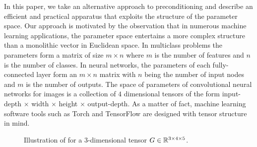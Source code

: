 In this paper, we take an alternative approach to preconditioning and describe
an efficient and practical apparatus that exploits the structure of the
parameter space.  Our approach is motivated by the observation that in
numerous machine learning applications, the parameter space entertains a more
complex structure than a monolithic vector in Euclidean space. In multiclass
problems the parameters form a matrix of size $m\times n$ where $m$ is the
number of features and $n$ is the number of classes. In neural networks, the
parameters of each fully-connected layer form an $m \times n$ matrix with $n$
being the number of input nodes and $m$ is the number of outputs. The space of
parameters of convolutional neural networks for images is a collection of $4$
dimensional tensors of the form input-depth $\times$ width $\times$ height
$\times$ output-depth. As a matter of fact, machine learning software tools
such as Torch and TensorFlow are designed with tensor structure in mind.



%
%      


\begin{figure}
  \begin{center}
  \end{center}
  \caption{\label{prect:fig}Illustration of \NAME for a $3$-dimensional tensor
  $G\in\mathbb{R}^{3 \times 4 \times 5}$.}
\end{figure}


